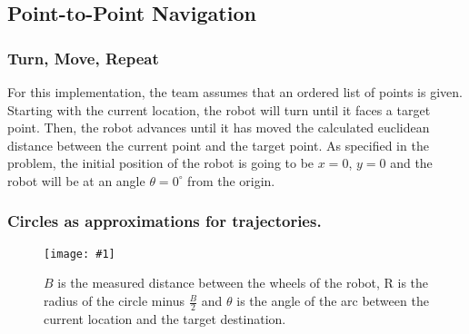 \documentclass[12pt,conference,onecolumn]{article} %
\newcommand{\myfigure}[4]{
  \begin{figure}[h!]
      \centering
      \texttt{[image: \#1]}
      \caption{#2}
\label{#4}
    \end{figure}
}
\begin{document}
\subsection*{Point-to-Point Navigation}

\subsubsection*{Turn, Move, Repeat}
For this implementation, the team assumes that an ordered list of points is given. Starting with the current location, the robot will turn until it faces a target point. Then, the robot advances until it has moved the calculated euclidean distance between the current point and the target point. As specified in the problem, the initial position of the robot is going to be $x=0$, $y=0$ and the robot will be at an angle $\theta=0^{\circ}$ from the origin.


\subsubsection*{Circles as approximations for trajectories.}
\myfigure{images/robotCircle.png}{$B$ is the measured distance between the wheels 
of the robot, R is the radius of the circle minus $\frac{B}{2}$ and $\theta$ is the angle of the arc between the current location and the target destination.}{0.5}{fig:robotCircle}
\end{document}
